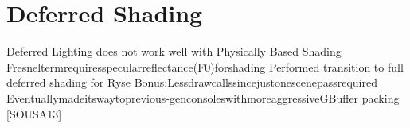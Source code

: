 \chapter{Deferred Shading}

 Deferred Lighting does not work well with Physically Based Shading 
 Fresneltermrequiresspecularreflectance(F0)forshading
 Performed transition to full deferred shading for Ryse
Bonus:Lessdrawcallssincejustonescenepassrequired
Eventuallymadeitswaytoprevious-genconsoleswithmoreaggressiveGBuffer packing [SOUSA13]